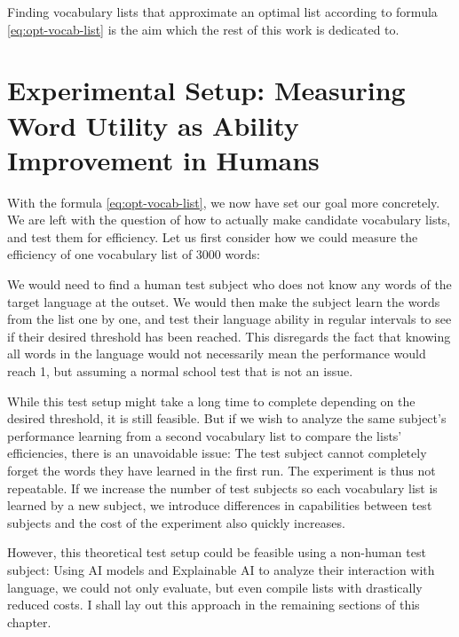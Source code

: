 Finding vocabulary lists that approximate an optimal list according to formula \ref{eq:opt-vocab-list} is the aim which the rest of this work is dedicated to.


\section{Experimental Setup: Measuring Word Utility as Ability Improvement in Humans} \label{sec:human-efficiency-testing}


With the formula \ref{eq:opt-vocab-list}, we now have set our goal more concretely.
We are left with the question of how to actually make candidate vocabulary lists, and test them for efficiency.
Let us first consider how we could measure the efficiency of one vocabulary list of 3000 words:

We would need to find a human test subject who does not know any words of the target language at the outset.
We would then make the subject learn the words from the list one by one, and test their language ability in regular intervals to see if their desired threshold has been reached.
This disregards the fact that knowing all words in the language would not necessarily mean the performance would reach 1, but assuming a normal school test that is not an issue.

While this test setup might take a long time to complete depending on the desired threshold, it is still feasible.
But if we wish to analyze the same subject's performance learning from a second vocabulary list to compare the lists' efficiencies, there is an unavoidable issue:
The test subject cannot completely forget the words they have learned in the first run.
The experiment is thus not repeatable.
If we increase the number of test subjects so each vocabulary list is learned by a new subject, we introduce differences in capabilities between test subjects and the cost of the experiment also quickly increases.

However, this theoretical test setup could be feasible using a non-human test subject:
Using AI models and Explainable AI to analyze their interaction with language, we could not only evaluate, but even compile lists with drastically reduced costs.
I shall lay out this approach in the remaining sections of this chapter.

